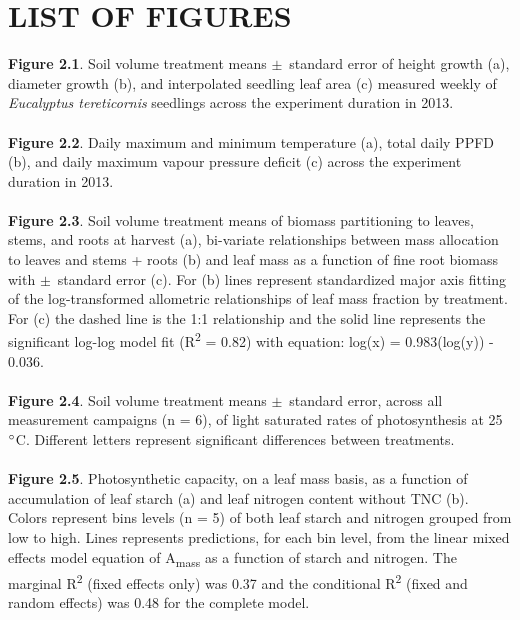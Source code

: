 \documentclass[a4paper]{article}\usepackage[]{graphicx}\usepackage[]{color}
\begin{document}
\clearpage
\section*{LIST OF FIGURES}

\textbf{Figure 2.1}. Soil volume treatment means $\pm$~standard error of height growth (a), diameter growth (b), and interpolated seedling leaf area (c) measured weekly of \textit{Eucalyptus tereticornis} seedlings across the experiment duration in 2013.
\\
\\
\textbf{Figure 2.2}. Daily maximum and minimum temperature (a), total daily PPFD (b), and daily maximum vapour pressure deficit (c) across the experiment duration in 2013.
\\
\\
\textbf{Figure 2.3}. Soil volume treatment means of biomass partitioning to leaves, stems, and roots at harvest (a), bi-variate relationships between mass allocation to leaves and stems + roots (b) and leaf mass as a function of fine root biomass with $\pm$~standard error (c). For (b) lines represent standardized major axis fitting of the log-transformed allometric relationships of leaf mass fraction by treatment. For (c) the dashed line is the 1:1 relationship and the solid line represents the significant log-log model fit (R\textsuperscript{2} = 0.82) with equation: log(x) = 0.983(log(y)) - 0.036.
\\
\\
\textbf{Figure 2.4}. Soil volume treatment means $\pm$~standard error, across all measurement campaigns (n = 6), of light saturated rates of photosynthesis at 25~$\degree$C. Different letters represent significant differences between treatments.
\\
\\
\textbf{Figure 2.5}. Photosynthetic capacity, on a leaf mass basis, as a function of accumulation of leaf starch (a) and leaf nitrogen content without TNC (b). Colors represent bins levels (n = 5) of both leaf starch and nitrogen grouped from low to high.  Lines represents predictions, for each bin level, from the linear mixed effects model equation of A\textsubscript{mass} as a function of starch and nitrogen. The marginal R\textsuperscript{2} (fixed effects only) was 0.37 and the conditional R\textsuperscript{2} (fixed and random effects) was 0.48 for the complete model.
\\
\end{document}
